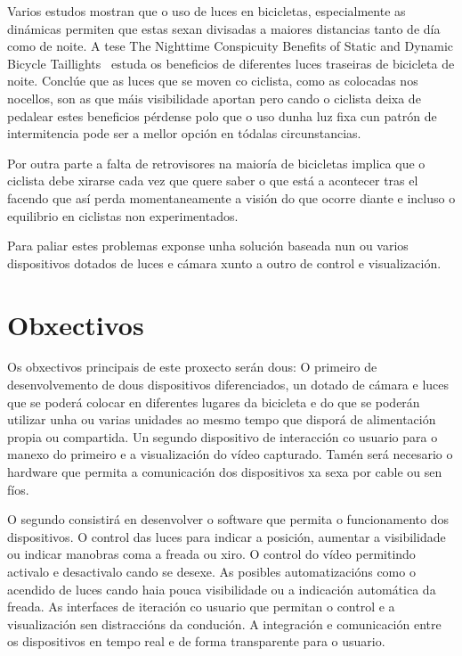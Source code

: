 Varios estudos mostran que o uso de luces en bicicletas, especialmente as dinámicas permiten que estas sexan divisadas a maiores distancias tanto de día como de noite. A tese The Nighttime Conspicuity Benefits of Static and Dynamic Bicycle Taillights~\cite{edewaardNighttimeConspicuityBenefits2017} estuda os beneficios de diferentes luces traseiras de bicicleta de noite. Conclúe que as luces que se moven co ciclista, como as colocadas nos nocellos, son as que máis visibilidade aportan pero cando o ciclista  deixa de pedalear estes beneficios pérdense polo que o uso dunha luz fixa cun patrón de intermitencia pode ser a mellor opción en tódalas circunstancias.

Por outra parte a falta de retrovisores na maioría de bicicletas implica que o ciclista debe xirarse cada vez que quere saber o que está a acontecer tras el facendo que así perda momentaneamente a visión do que ocorre diante e incluso o equilibrio en ciclistas non experimentados.

Para paliar estes problemas exponse unha solución baseada nun ou varios dispositivos dotados de luces e cámara xunto a outro de control e visualización.


\section{Obxectivos}
\label{sec:obxectivos}
Os obxectivos principais de este proxecto serán dous:
O primeiro de desenvolvemento de dous dispositivos diferenciados, un dotado de cámara e luces que se poderá colocar en diferentes lugares da bicicleta e do que se poderán utilizar unha ou varias unidades ao mesmo tempo que disporá de alimentación propia ou compartida. Un segundo dispositivo de interacción co usuario para o manexo do primeiro e a visualización do vídeo capturado. Tamén será necesario o hardware que permita a comunicación dos dispositivos xa sexa por cable ou sen fíos.

O segundo consistirá en desenvolver o software que permita o funcionamento dos dispositivos. O control das luces para indicar a posición, aumentar a visibilidade ou indicar manobras coma a freada ou xiro. O control do vídeo permitindo activalo e desactivalo cando se desexe. As posibles automatizacións como o acendido de luces cando haia pouca visibilidade ou a indicación automática da freada. As interfaces de iteración co usuario que permitan o control e a visualización sen distraccións da condución. A integración e comunicación entre os dispositivos en tempo real e de forma transparente para o usuario.

